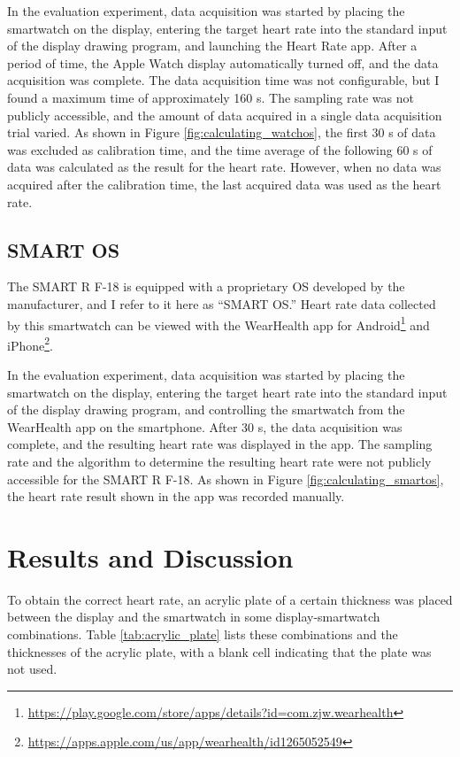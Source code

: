 In the evaluation experiment, data acquisition was started by placing the smartwatch on the display, entering the target heart rate into the standard input of the display drawing program, and launching the Heart Rate app. After a period of time, the Apple Watch display automatically turned off, and the data acquisition was complete. The data acquisition time was not configurable, but I found a maximum time of approximately 160 s. The sampling rate was not publicly accessible, and the amount of data acquired in a single data acquisition trial varied. As shown in Figure \ref{fig:calculating_watchos}, the first 30 s of data was excluded as calibration time, and the time average of the following 60 s of data was calculated as the result for the heart rate. However, when no data was acquired after the calibration time, the last acquired data was used as the heart rate.

\subsection{SMART OS}
The SMART R F-18 is equipped with a proprietary OS developed by the manufacturer, and I refer to it here as ``SMART OS.'' Heart rate data collected by this smartwatch can be viewed with the WearHealth app for Android\footnote{\url{https://play.google.com/store/apps/details?id=com.zjw.wearhealth}} and iPhone\footnote{\url{https://apps.apple.com/us/app/wearhealth/id1265052549}}.\par

In the evaluation experiment, data acquisition was started by placing the smartwatch on the display, entering the target heart rate into the standard input of the display drawing program, and controlling the smartwatch from the WearHealth app on the smartphone. After 30 s, the data acquisition was complete, and the resulting heart rate was displayed in the app. The sampling rate and the algorithm to determine the resulting heart rate were not publicly accessible for the SMART R F-18. As shown in Figure \ref{fig:calculating_smartos}, the heart rate result shown in the app was recorded manually.


\section{Results and Discussion}
To obtain the correct heart rate, an acrylic plate of a certain thickness was placed between the display and the smartwatch in some display-smartwatch combinations. Table \ref{tab:acrylic_plate} lists these combinations and the thicknesses of the acrylic plate, with a blank cell indicating that the plate was not used.\par

